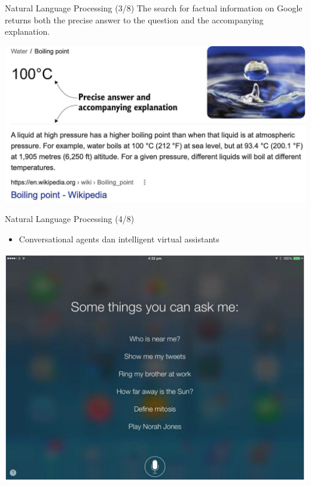 \documentclass[pdf]{beamer}
\theoremstyle{mystyle}
\begin{document}
\begin{frame}{Natural Language Processing (3/8)}
The search for factual information on Google returns both the precise answer to the question and the accompanying explanation.
	\begin{center}
		\includegraphics[scale=.25]{images/search-engine-4}
	\end{center}
\end{frame}

\begin{frame}{Natural Language Processing (4/8)}
	\begin{itemize}
		\item Conversational agents dan intelligent virtual assistants
	\end{itemize}
	\begin{center}
		\includegraphics[scale=.225]{images/conversational-1}
	\end{center}
\end{frame}
\end{document}
